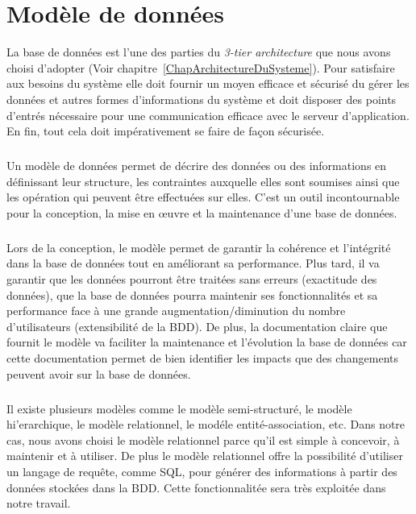 \chapter{Mod\`ele de donn\'ees}
	La base de donn\'ees est l'une des parties du \textit{3-tier architecture} que nous avons choisi d'adopter (Voir chapitre~\ref{ChapArchitectureDuSysteme}). Pour satisfaire aux besoins du syst\`eme elle doit fournir un moyen efficace et s\'ecuris\'e du g\'erer les donn\'ees et autres formes d'informations du syst\`eme et doit disposer des points d'entr\'es n\'ecessaire pour une communication efficace avec le serveur d'application. En fin, tout cela doit imp\'erativement se faire de fa\c{c}on s\'ecuris\'ee.

	\paragraph{} Un mod\`ele de donn\'ees permet de d\'ecrire des donn\'ees ou des informations\cite{ModeleDeDonneesDefinition} en d\'efinissant leur structure, les contraintes auxquelle elles sont soumises ainsi que les op\'eration qui peuvent \^etre effectu\'ees sur elles. C'est un outil incontournable pour la conception, la mise en \oe{}uvre et la maintenance d'une base de donn\'ees.


	\paragraph{} Lors de la conception, le mod\`ele permet de garantir la coh\'erence et l'int\'egrit\'e dans la base de donn\'ees tout en am\'eliorant sa performance. Plus tard, il va garantir que les donn\'ees pourront \^etre trait\'ees sans erreurs (exactitude des donn\'ees), que la base de donn\'ees pourra maintenir ses fonctionnalit\'es et sa performance face \`a une grande augmentation/diminution du nombre d'utilisateurs (extensibilit\'e de la BDD). De plus, la documentation claire que fournit le mod\`ele va faciliter la maintenance et l'\'evolution la base de donn\'ees car cette documentation permet de bien identifier les impacts que  des changements peuvent avoir sur la base de donn\'ees.

	\paragraph{} Il existe plusieurs mod\`eles comme le mod\`ele semi-structur\'e, le mod\`ele hi'erarchique, le mod\`ele relationnel, le mod\'ele entit\'e-association\cite{ModeleDeDonneesDefinition}, etc. Dans notre cas, nous avons choisi le mod\`ele relationnel parce qu'il est simple \`a concevoir, \`a maintenir et \`a utiliser. De plus le mod\`ele relationnel offre la possibilit\'e d'utiliser un langage de requ\^ete, comme SQL, pour g\'en\'erer des informations \`a partir des donn\'ees stock\'ees dans la BDD. Cette fonctionnalit\'ee sera tr\`es exploit\'ee dans notre travail.




